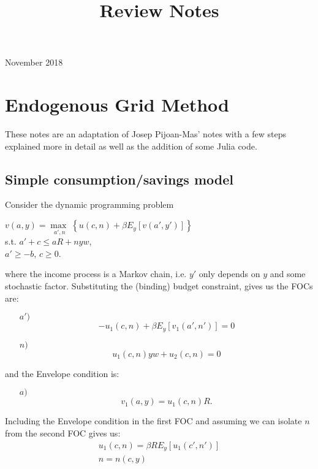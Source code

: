 \documentclass[11pt]{article}
\theoremstyle{definition}
\begin{document}
\setcounter{section}{0}
\title{Review Notes}

\thispagestyle{empty}

\begin{center}
November 2018
\end{center}
\section{Endogenous Grid Method}
These notes are an adaptation of Josep Pijoan-Mas' notes with a few steps explained more in detail as well as the addition of some Julia code.

\subsection{Simple consumption/savings model}
Consider the dynamic programming problem
\begin{center}
	$v(a,y)= \underset{a',n}{\max\;}\left\{u(c,n) + \beta E_{y}\left[v(a',y')\right] \right\}$\\
	s.t. $a'+c\leq aR + nyw$,\\
	$a'\geq -b$, $c\geq 0$.
\end{center}
where the income process is a Markov chain, i.e. $y'$ only depends on $y$ and some stochastic factor. Substituting the (binding) budget constraint, gives us the FOCs are:
\begin{itemize}
	\item[$a')$] $$-u_{1}(c,n)+\beta E_{y}\left[v_{1}(a',n')\right]=0$$
	\item[$n)$] $$u_{1}(c,n)yw + u_{2}(c,n)=0$$
\end{itemize}
and the Envelope condition is:
\begin{itemize}
	\item[$a)$]$$v_{1}(a,y)=u_{1}(c,n)R.$$
\end{itemize}

Including the Envelope condition in the first FOC and assuming we can isolate $n$ from the second FOC gives us:
\begin{eqnarray}
u_{1}(c,n)=\beta R E_{y}\left[u_{1}(c',n')\right]\\
n = n(c,y)
\end{eqnarray}
\end{document}
